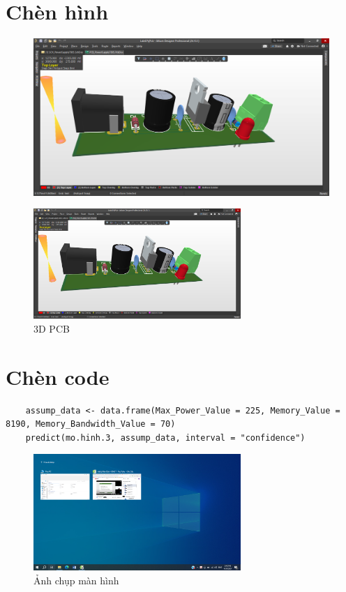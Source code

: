 \documentclass[twoside, final]{hcmut_report}
\begin{document}
\section{Chèn hình}
\begin{figure}[!htbp]
    \centering
    \includegraphics[width=1\textwidth]{graphics/f5.PNG}
\end{figure}
\begin{figure}[!htbp]
    \centering
    \includegraphics[width=0.7\textwidth]{graphics/f5.PNG}
    \caption{3D PCB}
\end{figure}

\section{Chèn code}
\begin{lstlisting}
    assump_data <- data.frame(Max_Power_Value = 225, Memory_Value = 8190, Memory_Bandwidth_Value = 70)
    predict(mo.hinh.3, assump_data, interval = "confidence")
\end{lstlisting}
\begin{figure}[!htbp]
    \centering
    \includegraphics[width=0.7\textwidth]{graphics/thu_thoi.png}
    \caption{Ảnh chụp màn hình}
\end{figure}
\end{document}
